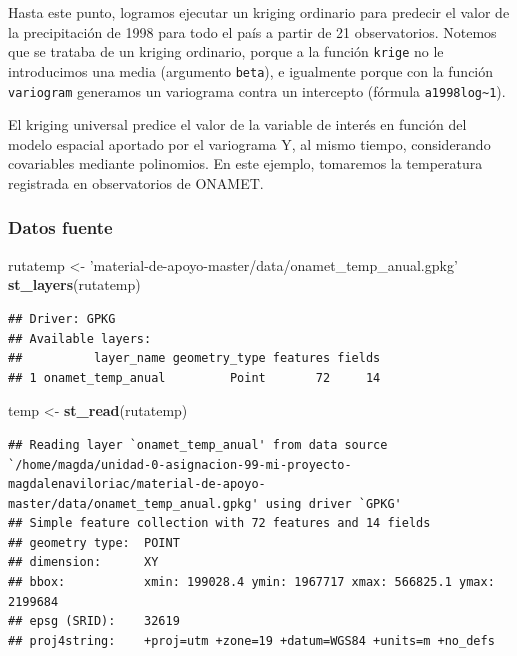 \documentclass[11pt,]{article}
\newenvironment{Shaded}{\begin{snugshade}}{\end{snugshade}}
\newcommand{\KeywordTok}[1]{\textcolor[rgb]{0.13,0.29,0.53}{\textbf{#1}}}
\newcommand{\StringTok}[1]{\textcolor[rgb]{0.31,0.60,0.02}{#1}}
\newcommand{\NormalTok}[1]{#1}
\begin{document}
Hasta este punto, logramos ejecutar un kriging ordinario para predecir
el valor de la precipitación de 1998 para todo el país a partir de 21
observatorios. Notemos que se trataba de un kriging ordinario, porque a
la función \texttt{krige} no le introducimos una media (argumento
\texttt{beta}), e igualmente porque con la función \texttt{variogram}
generamos un variograma contra un intercepto (fórmula
\texttt{a1998log\textasciitilde{}1}).

El kriging universal predice el valor de la variable de interés en
función del modelo espacial aportado por el variograma Y, al mismo
tiempo, considerando covariables mediante polinomios. En este ejemplo,
tomaremos la temperatura registrada en observatorios de ONAMET.

\subsubsection{Datos fuente}\label{datos-fuente-1}

\begin{Shaded}
\begin{Highlighting}[]
\NormalTok{rutatemp <-}\StringTok{ 'material-de-apoyo-master/data/onamet_temp_anual.gpkg'}
\KeywordTok{st_layers}\NormalTok{(rutatemp)}
\end{Highlighting}
\end{Shaded}

\begin{verbatim}
## Driver: GPKG 
## Available layers:
##          layer_name geometry_type features fields
## 1 onamet_temp_anual         Point       72     14
\end{verbatim}

\begin{Shaded}
\begin{Highlighting}[]
\NormalTok{temp <-}\StringTok{ }\KeywordTok{st_read}\NormalTok{(rutatemp)}
\end{Highlighting}
\end{Shaded}

\begin{verbatim}
## Reading layer `onamet_temp_anual' from data source `/home/magda/unidad-0-asignacion-99-mi-proyecto-magdalenaviloriac/material-de-apoyo-master/data/onamet_temp_anual.gpkg' using driver `GPKG'
## Simple feature collection with 72 features and 14 fields
## geometry type:  POINT
## dimension:      XY
## bbox:           xmin: 199028.4 ymin: 1967717 xmax: 566825.1 ymax: 2199684
## epsg (SRID):    32619
## proj4string:    +proj=utm +zone=19 +datum=WGS84 +units=m +no_defs
\end{verbatim}
\end{document}
